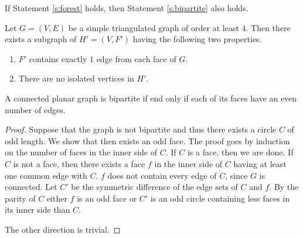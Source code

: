 \begin{remark}
  If Statement \ref{s:forest} holds, then Statement \ref{s:bipartite} also holds.
\end{remark}

\begin{guess}\label{s:no_iso}
  Let $G = (V, E)$ be a simple triangulated graph of order at least $4$. Then there
  exists a subgraph of $H' = (V, F')$ having the following two properties.
  \begin{enumerate}
    \item $F'$ contains exactly $1$ edge from each face of $G$.
    \item There are no isolated vertices in $H'$.
  \end{enumerate}
\end{guess}

\begin{lemma}\label{l:bipartite}
  A connected planar graph is bipartite if end only if each of its faces have an
  even number of edges.
\end{lemma}
\begin{proof}
  Suppose that the graph is not bipartite and thus there exists a circle $C$ of odd
  length. We show that then exists an odd face. The proof goes by induction on the
  number of faces in the inner side of $C$. If $C$ is a face, then we are done.
  If $C$ is not a face, then there exists a face $f$ in the inner side of $C$ having at least one
  common edge with $C$. $f$ does not contain every edge of $C$, since $G$ is connected.
  Let $C'$ be the symmetric difference of the edge sets of $C$ and $f$. By the parity of $C$
  either $f$ is an odd face or $C'$ is an odd circle containing less faces in its
  inner side than $C$.

  The other direction is trivial.
\end{proof}

